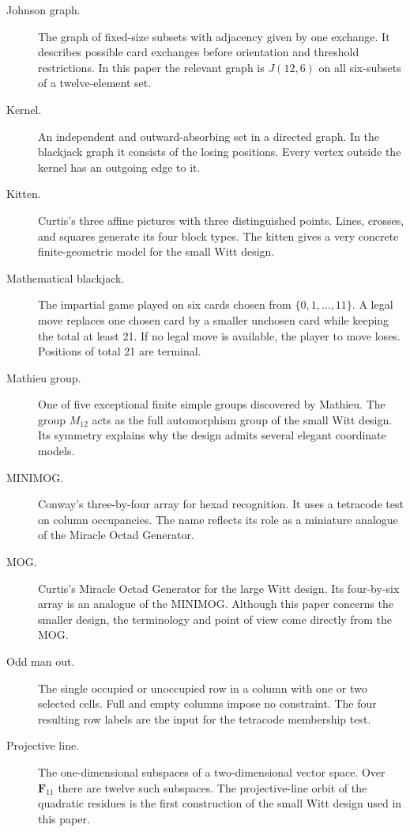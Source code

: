 \documentclass[12pt,letterpaper]{article}
\theoremstyle{definition}\newtheorem{example}[theorem]{Example}
\numberwithin{equation}{section}
\newcommand{\F}{\mathbf F}
\begin{document}
\begin{description}
\item[Johnson graph.] The graph of fixed-size subsets with adjacency given by one exchange. It describes possible card exchanges before orientation and threshold restrictions. In this paper the relevant graph is $J(12,6)$ on all six-subsets of a twelve-element set.

\item[Kernel.] An independent and outward-absorbing set in a directed graph. In the blackjack graph it consists of the losing positions. Every vertex outside the kernel has an outgoing edge to it.

\item[Kitten.] Curtis's three affine pictures with three distinguished points. Lines, crosses, and squares generate its four block types. The kitten gives a very concrete finite-geometric model for the small Witt design.

\item[Mathematical blackjack.] The impartial game played on six cards chosen from $\{0,1,\dots,11\}$. A legal move replaces one chosen card by a smaller unchosen card while keeping the total at least 21. If no legal move is available, the player to move loses. Positions of total 21 are terminal.

\item[Mathieu group.] One of five exceptional finite simple groups discovered by Mathieu. The group $M_{12}$ acts as the full automorphism group of the small Witt design. Its symmetry explains why the design admits several elegant coordinate models.

\item[MINIMOG.] Conway's three-by-four array for hexad recognition. It uses a tetracode test on column occupancies. The name reflects its role as a miniature analogue of the Miracle Octad Generator.

\item[MOG.] Curtis's Miracle Octad Generator for the large Witt design. Its four-by-six array is an analogue of the MINIMOG. Although this paper concerns the smaller design, the terminology and point of view come directly from the MOG.

\item[Odd man out.] The single occupied or unoccupied row in a column with one or two selected cells. Full and empty columns impose no constraint. The four resulting row labels are the input for the tetracode membership test.

\item[Projective line.] The one-dimensional subspaces of a two-dimensional vector space. Over $\F_{11}$ there are twelve such subspaces. The projective-line orbit of the quadratic residues is the first construction of the small Witt design used in this paper.


\end{description}
\end{document}
